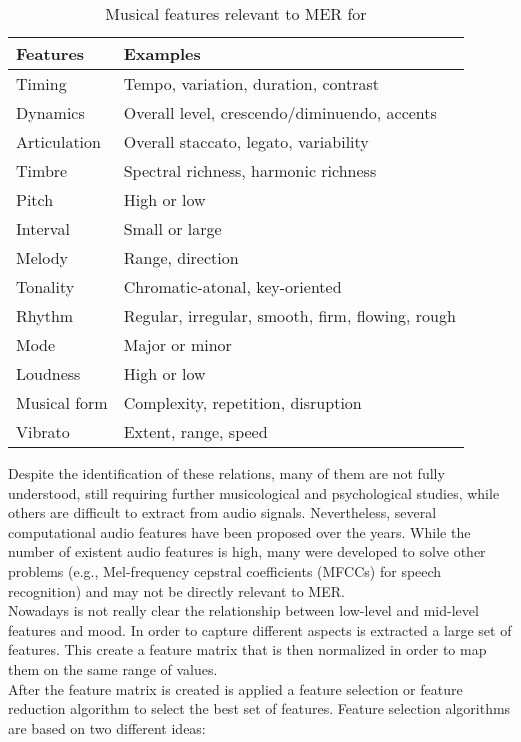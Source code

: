\begin{table}[h!]
\centering
	\begin{tabular}{|l|l|}
		\hline
		Features & Examples\\ [0.5ex] 
		\hline\hline Timing		&	Tempo, variation, duration, contrast \\ 
		\hline Dynamics			&	Overall level, crescendo/diminuendo, accents \\
		\hline Articulation		&	Overall staccato, legato, variability	 \\
		\hline Timbre				&	Spectral richness, harmonic richness \\
		\hline Pitch				&	High or low \\
		\hline Interval			&	Small or large \\
		\hline Melody			&	Range, direction \\
		\hline Tonality			&	Chromatic-atonal, key-oriented \\
		\hline Rhythm			&	Regular, irregular, smooth, firm, flowing, rough \\ 
		\hline Mode				&	 Major or minor \\ 
		\hline Loudness			&	 High or low \\ 
		\hline Musical form	&	 Complexity, repetition, disruption \\ 
		\hline Vibrato				&	 Extent, range, speed \\ 
		\hline
	\end{tabular}
	\caption{Musical features relevant to MER for \cite{panda2018novel}}
	\label{table:musical_features_relevant}
\end{table}
Despite the identification of these relations, many of them are not fully understood, still requiring further musicological and psychological studies, while others are difficult to extract from audio signals. Nevertheless, several computational audio features have been proposed over the years. While the number of existent audio features is high, many were developed to solve other problems (e.g., Mel-frequency cepstral coefficients (MFCCs) for speech recognition) and may not be directly relevant to MER.
\\ \indent
Nowadays is not really clear the relationship between low-level and mid-level features and mood. In order to capture different aspects is extracted a large set of features. This create a feature matrix that is then normalized in order to map them on the same range of values.
\\ \indent
After the feature matrix is created is applied a feature selection or feature reduction algorithm to select the best set of features. Feature selection algorithms are based on two different ideas:
